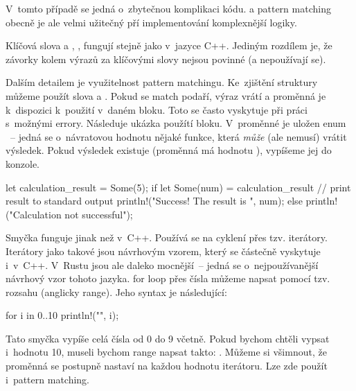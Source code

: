 \documentclass[main.tex]{subfiles}
\begin{document}
V~tomto případě se jedná o~zbytečnou komplikaci kódu.  a pattern matching
obecně je ale velmi užitečný pří implementování komplexnější logiky.



Klíčová slova  a , ,  fungují stejně
jako v~jazyce C++. Jediným rozdílem je, že závorky kolem výrazů za klíčovými slovy
nejsou povinné (a nepoužívají se).

Dalším detailem je využitelnost pattern matchingu. Ke~zjištění struktury můžeme použít
slova  a . Pokud se match podaří, výraz vrátí
 a proměnná je k~dispozici k~použití v~daném bloku. Toto se často vyskytuje
při práci s~možnými errory. Následuje ukázka použítí  bloku. V~proměnné
 je uložen enum ~-- jedná se o~návratovou
hodnotu nějaké funkce, která \emph{může} (ale nemusí) vrátit výsledek. Pokud výsledek
existuje (proměnná má hodnotu ), vypíšeme jej do konzole.

\obrazek
\begin{rustcode}
    let calculation_result = Some(5);
    if let Some(num) = calculation_result {
        // print result to standard output
        println!("Success! The result is {}", num);
    } else {
        println!("Calculation not successful");
    }
\end{rustcode}


Smyčka  funguje jinak než v~C++. Používá se na cyklení přes tzv. iterátory.
Iterátory jako takové jsou návrhovým vzorem, který se částečně vyskytuje i~v~C++.
V~Rustu jsou ale daleko mocnější~-- jedná se o~nejpoužívanější návrhový vzor tohoto
jazyka.  for loop přes čísla můžeme napsat pomocí tzv. rozsahu
(anglicky range). Jeho syntax je následující:

\obrazek
\begin{rustcode}
    for i in 0..10 {
        println!("{}", i);
    }
\end{rustcode}

Tato smyčka vypíše celá čísla od 0 do 9 včetně. Pokud bychom chtěli vypsat i~hodnotu 10,
museli bychom range napsat takto: . Můžeme si všimnout, že proměnná
 se postupně nastaví na každou hodnotu iterátoru. Lze zde použít i~pattern
matching. \cite[sekce 8.2.13]{reference}
\end{document}
